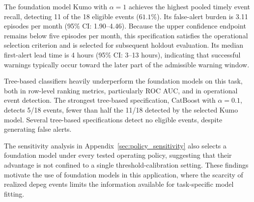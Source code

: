 \documentclass[a4paper,fleqn]{cas-sc}
\begin{document}
The foundation model Kumo with $\alpha=1$ achieves the highest pooled timely event recall, detecting 11 of the 18 eligible events ($61.1\%$). Its false-alert burden is 3.11 episodes per month (95\% CI: 1.90--4.46). Because the upper confidence endpoint remains below five episodes per month, this specification satisfies the operational selection criterion and is selected for subsequent holdout evaluation. Its median first-alert lead time is 4 hours (95\% CI: 3--13 hours), indicating that successful warnings typically occur toward the later part of the admissible warning window.

Tree-based classifiers heavily underperform the foundation models on this task, both in row-level ranking metrics, particularly ROC AUC, and in operational event detection. The strongest tree-based specification, CatBoost with $\alpha=0.1$, detects 5/18 events, fewer than half the 11/18 detected by the selected Kumo model. Several tree-based specifications detect no eligible events, despite generating false alerts.

The sensitivity analysis in Appendix~\ref{sec:policy_sensitivity} also selects a foundation model under every tested operating policy, suggesting that their advantage is not confined to a single threshold-calibration setting. These findings motivate the use of foundation models in this application, where the scarcity of realized depeg events limits the information available for task-specific model fitting.
\end{document}

